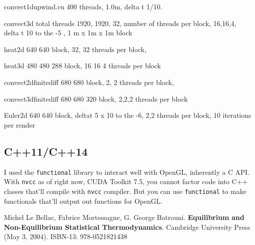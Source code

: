\documentclass[10pt]{amsart}
\begin{document}
convect1dupwind.cu 400 threads, 1.0m, delta t 1/10.

convect3d total threads 1920, 1920, 32, number of threads per block, 16,16,4, delta t 10 to the -5 , 1 m x 1m x 1m block

heat2d 640 640 block, 32, 32 threads per block,

heat3d 480 480 288 block, 16 16 4 threads per block 

convect2dfinitediff 680 680 block, 2, 2 threads per block,

convect3dfinitediff 680 680 320 block, 2,2,2 threads per block

Euler2d 640 640 block, deltat 5 x 10 to the -6, 2,2 threads per block, 10 iterations per render

\subsection{C++11/C++14}

I used the \verb|functional| library to interact well with OpenGL, inherently a C API.  With \verb|nvcc| as of right now, CUDA Toolkit 7.5, you cannot factor code into C++ classes that'll compile with \verb|nvcc| compiler.  But you can use \verb|functional| to make functionals that'll output out functions for OpenGL.  


\begin{thebibliography}{9}
Michel Le Bellac, Fabrice Mortessagne, G. George Batrouni.  \textbf{Equilibrium and Non-Equilibrium Statistical Thermodynamics}.  Cambridge University Press (May 3, 2004).  ISBN-13: 978-0521821438

\end{thebibliography}
\end{document}

